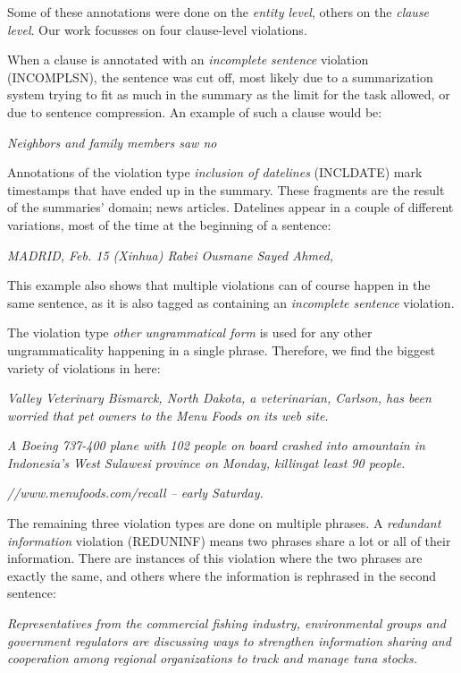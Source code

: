 \documentclass[a4paper,10pt]{scrartcl}
\theoremstyle{style}
\begin{document}
Some of these annotations were done on the \textit{entity level}, others on the \textit{clause level}. Our work focusses on four clause-level violations.

When a clause is annotated with an \textit{incomplete sentence} violation (INCOMPLSN), the sentence was cut off, most likely due to a summarization system trying to fit as much in the summary as the limit for the task allowed, or due to sentence compression. An example of such a clause would be:

\quad\textit{Neighbors and family members saw no}

Annotations of the violation type \textit{inclusion of datelines} (INCLDATE) mark timestamps that have ended up in the summary. These fragments are the result of the summaries' domain; news articles. Datelines appear in a couple of different variations, most of the time at the beginning of a sentence:

\quad\textit{MADRID, Feb. 15 (Xinhua) Rabei Ousmane Sayed Ahmed,}

This example also shows that multiple violations can of course happen in the same sentence, as it is also tagged as containing an \textit{incomplete sentence} violation.

The violation type \textit{other ungrammatical form} is used for any other ungrammaticality happening in a single phrase. Therefore, we find the biggest variety of violations in here:

\quad\textit{Valley Veterinary Bismarck, North Dakota, a veterinarian, Carlson, has been worried that pet owners to the Menu Foods on its web site.}

\quad\textit{A Boeing 737-400 plane with 102 people on board crashed into amountain in Indonesia's West Sulawesi province on Monday, killingat least 90 people.}

\quad\textit{//www.menufoods.com/recall -- early Saturday.}

The remaining three violation types are done on multiple phrases. A \textit{redundant information} violation (REDUNINF) means two phrases share a lot or all of their information. There are instances of this violation where the two phrases are exactly the same, and others where the information is rephrased in the second sentence:

\quad\textit{Representatives from the commercial fishing industry, environmental groups and government regulators are discussing ways to strengthen information sharing and cooperation among regional organizations to track and manage tuna stocks.}
\end{document}
